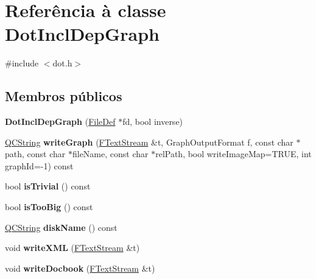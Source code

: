 \hypertarget{class_dot_incl_dep_graph}{\section{Referência à classe Dot\-Incl\-Dep\-Graph}
\label{class_dot_incl_dep_graph}
}


{\ttfamily \#include $<$dot.\-h$>$}

\subsection*{Membros públicos}
\begin{DoxyCompactItemize}
\item 
\hypertarget{class_dot_incl_dep_graph_ae26ffa57903feccc13cdf3ad86440e3c}{{\bfseries Dot\-Incl\-Dep\-Graph} (\hyperlink{class_file_def}{File\-Def} $\ast$fd, bool inverse)}\label{class_dot_incl_dep_graph_ae26ffa57903feccc13cdf3ad86440e3c}

\item 
\hypertarget{class_dot_incl_dep_graph_af0f58a9e435e7e0e753813e6e40018e6}{\hyperlink{class_q_c_string}{Q\-C\-String} {\bfseries write\-Graph} (\hyperlink{class_f_text_stream}{F\-Text\-Stream} \&t, Graph\-Output\-Format f, const char $\ast$path, const char $\ast$file\-Name, const char $\ast$rel\-Path, bool write\-Image\-Map=T\-R\-U\-E, int graph\-Id=-\/1) const }\label{class_dot_incl_dep_graph_af0f58a9e435e7e0e753813e6e40018e6}

\item 
\hypertarget{class_dot_incl_dep_graph_a3359ce63bc7239a94a35485704af1993}{bool {\bfseries is\-Trivial} () const }\label{class_dot_incl_dep_graph_a3359ce63bc7239a94a35485704af1993}

\item 
\hypertarget{class_dot_incl_dep_graph_a5867a12e614d417ec919a945ffa92cb1}{bool {\bfseries is\-Too\-Big} () const }\label{class_dot_incl_dep_graph_a5867a12e614d417ec919a945ffa92cb1}

\item 
\hypertarget{class_dot_incl_dep_graph_a0852c594a36fbcc44f5c947d6bf60646}{\hyperlink{class_q_c_string}{Q\-C\-String} {\bfseries disk\-Name} () const }\label{class_dot_incl_dep_graph_a0852c594a36fbcc44f5c947d6bf60646}

\item 
\hypertarget{class_dot_incl_dep_graph_acb326c95f60ee5e186e386f41c2d1e9e}{void {\bfseries write\-X\-M\-L} (\hyperlink{class_f_text_stream}{F\-Text\-Stream} \&t)}\label{class_dot_incl_dep_graph_acb326c95f60ee5e186e386f41c2d1e9e}

\item 
\hypertarget{class_dot_incl_dep_graph_ac8e038a04d11565bfe448e7a67513890}{void {\bfseries write\-Docbook} (\hyperlink{class_f_text_stream}{F\-Text\-Stream} \&t)}\label{class_dot_incl_dep_graph_ac8e038a04d11565bfe448e7a67513890}

\end{DoxyCompactItemize}


